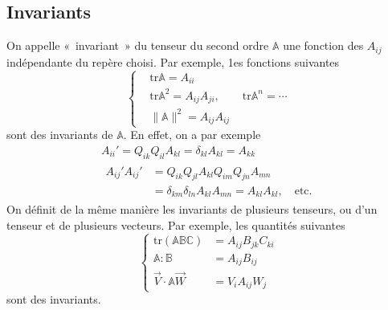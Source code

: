 \subsection{Invariants}
On appelle «~invariant~» du tenseur du second ordre $\mathbb{A}$ une fonction des $A_{ij}$ indépendante du repère choisi.
Par exemple, 1es fonctions suivantes
\begin{equation}
    \left\{
    \begin{aligned}
        & \mathrm{tr} \mathbb{A} = A_{ii} \\
        & \mathrm{tr} \mathbb{A}^2 = A_{ij} A_{ji} , \qquad \mathrm{tr} \mathbb{A}^n = \cdots \\
        & \| \mathbb{A} \|^2 = A_{ij} A_{ij}
    \end{aligned}
    \right.
    \label{eq:AnnA-028}
\end{equation}
sont des invariants de $\mathbb{A}$.
En effet, on a par exemple
\begin{gather*}
    A_{ii}' = Q_{ik} Q_{il} A_{kl} = \delta_{kl} A_{kl} = A_{kk} \\
    \begin{align*}
        A_{ij}' A_{ij}' &= Q_{ik} Q_{jl} A_{kl} Q_{im} Q_{jn} A_{mn}\\
        &= \delta_{km} \delta_{ln} A_{kl} A_{mn} = A_{kl} A_{kl}, \quad \text{etc.}
    \end{align*}
\end{gather*}
On définit de la même manière les invariants de plusieurs tenseurs, ou d'un tenseur et de plusieurs vecteurs.
Par exemple, les quantités suivantes
\begin{equation}
    \left\{
    \begin{aligned}
        \mathrm{tr} \left( \mathbb{A} \mathbb{B} \mathbb{C} \right) &= A_{ij} B_{jk} C_{ki} \\
        \mathbb{A} : \mathbb{B} &= A_{ij} B_{ij} \\
        \vec{V}\cdot \mathbb{A} \vec{W} &= V_{i} A_{ij} W_j
    \end{aligned}
    \right.
    \label{eq:AnnA-029}
\end{equation}
sont des invariants.

